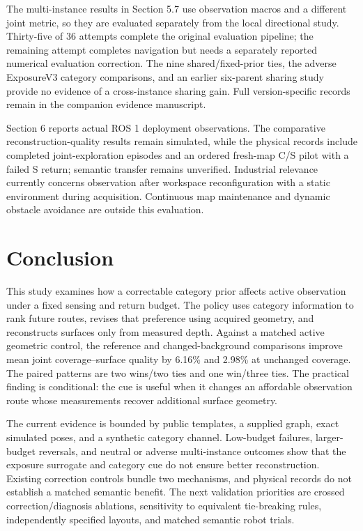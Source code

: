 \documentclass[11pt,a4paper]{article}
\providecommand{\hypertarget}[2]{#2}
\begin{document}
The multi-instance results in Section 5.7 use observation macros and a different joint metric, so they are evaluated separately from the local directional study. Thirty-five of 36 attempts complete the original evaluation pipeline; the remaining attempt completes navigation but needs a separately reported numerical evaluation correction. The nine shared/fixed-prior ties, the adverse ExposureV3 category comparisons, and an earlier six-parent sharing study provide no evidence of a cross-instance sharing gain. Full version-specific records remain in the companion evidence manuscript.

Section 6 reports actual ROS 1 deployment observations. The comparative reconstruction-quality results remain simulated, while the physical records include completed joint-exploration episodes and an ordered fresh-map C/S pilot with a failed S return; semantic transfer remains unverified. Industrial relevance currently concerns observation after workspace reconfiguration with a static environment during acquisition. Continuous map maintenance and dynamic obstacle avoidance are outside this evaluation.

\hypertarget{conclusion}{%
\section{Conclusion}\label{conclusion}}

This study examines how a correctable category prior affects active observation under a fixed sensing and return budget. The policy uses category information to rank future routes, revises that preference using acquired geometry, and reconstructs surfaces only from measured depth. Against a matched active geometric control, the reference and changed-background comparisons improve mean joint coverage--surface quality by 6.16\% and 2.98\% at unchanged coverage. The paired patterns are two wins/two ties and one win/three ties. The practical finding is conditional: the cue is useful when it changes an affordable observation route whose measurements recover additional surface geometry.

The current evidence is bounded by public templates, a supplied graph, exact simulated poses, and a synthetic category channel. Low-budget failures, larger-budget reversals, and neutral or adverse multi-instance outcomes show that the exposure surrogate and category cue do not ensure better reconstruction. Existing correction controls bundle two mechanisms, and physical records do not establish a matched semantic benefit. The next validation priorities are crossed correction/diagnosis ablations, sensitivity to equivalent tie-breaking rules, independently specified layouts, and matched semantic robot trials.
\end{document}
